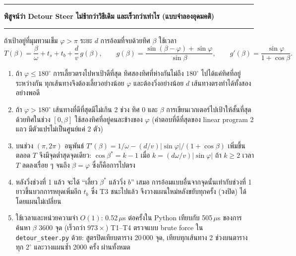 \documentclass[11pt,a4paper]{article}
\begin{document}
\newpage
\noindent\rule{\linewidth}{1.1pt}\par\vspace{1.4mm}
\noindent\textbf{พิสูจน์ว่า Detour Steer ไม่ช้ากว่าวิธีเดิม และเร็วกว่าเท่าไร (แบบจำลองอุดมคติ)}\par\vspace{1.4mm}
\noindent\rule{\linewidth}{0.5pt}\par\vspace{1mm}
{\small
\noindent ถ้าเป้าอยู่ที่มุมทวนเข็ม $\varphi > \pi$ ระยะ $d$ การอ้อมที่จบด้วยทิศ $\beta$ ใช้เวลา
\[
  T(\beta) = \frac{\beta}{\omega} + t_s + t_b + \frac{d}{v}\,g(\beta), \qquad
  g(\beta) = \frac{\sin(\beta-\varphi) + \sin\varphi}{\sin\beta}, \qquad
  g'(\beta) = \frac{\sin\varphi}{1 + \cos\beta}.
\]
\begin{enumerate}\setlength\itemsep{0.4mm}
\item[\textbf{T1.}] ถ้า $\varphi \le 180^\circ$ การเลี้ยวตรงไปหาเป้าดีที่สุด
  ทิศสองทิศที่ห่างกันไม่ถึง $180^\circ$ ไปได้แค่ทิศที่อยู่ระหว่างกัน ทุกเส้นทางจึงต้องเลี้ยวอย่างน้อย $\varphi$
  และต้องวิ่งอย่างน้อย $d$ เส้นทางตรงทำได้ทั้งสองอย่างพอดี
\item[\textbf{T2.}] ถ้า $\varphi > 180^\circ$ เส้นทางที่ดีที่สุดมีไม่เกิน 2 ช่วง ทิศ $0$ และ $\beta$
  การเขียนเวกเตอร์ไปเป้าให้สั้นที่สุดด้วยทิศในช่วง $[0, \beta]$ ใช้สองทิศที่อยู่คนละข้างของ $\varphi$
  (คำตอบที่ดีที่สุดของ linear program 2 แถว มีตัวแปรไม่เป็นศูนย์แค่ 2 ตัว)
\item[\textbf{T3.}] บนช่วง $(\pi, 2\pi)$ อนุพันธ์ $T'(\beta) = 1/\omega - (d/v)\lvert\sin\varphi\rvert/(1+\cos\beta)$ เพิ่มขึ้นตลอด
  $T$ จึงมีจุดต่ำสุดจุดเดียว: $\cos\beta^\ast = k - 1$ เมื่อ $k = (d\omega/v)\lvert\sin\varphi\rvert$
  ถ้า $k \ge 2$ เวลา $T$ ลดลงเรื่อย ๆ จนถึง $\beta = \varphi$ ซึ่งก็คือการไปตรง
\item[\textbf{T4.}] หลังวิ่งช่วงที่ 1 แล้ว  จะได้ ``เลี้ยว $\beta^\ast$ แล้ววิ่ง $b$'' เสมอ
  การอ้อมแบบอื่นจากจุดนั้นเท่ากับช่วงที่ 1 ยาวขึ้นบวกการหยุดเพิ่มอีก $t_b$ ซึ่ง T3 ชนะไปแล้ว
  จึงวางแผนใหม่หลังขยับทุกครั้ง (วงปิด) ได้โดยแผนไม่เปลี่ยน
\item[\textbf{O.}] \FPlan{} ใช้เวลาและหน่วยความจำ $O(1)$: 0.52\,$\mu$s ต่อครั้งใน Python เทียบกับ 505\,$\mu$s
  ของการค้นหา $\beta$ 3600 จุด (เร็วกว่า $973\times$) T1--T4 ตรวจแบบ brute force ใน
  \texttt{detour\_steer.py} ด้วย: สูตรปิดเทียบตาราง 20\,000 จุด, เทียบทุกเส้นทาง 2 ช่วงบนตารางทุก
  $2^\circ$ และวางแผนซ้ำ 2000 ครั้ง ผ่านทั้งหมด
\end{enumerate}

}
\end{document}
